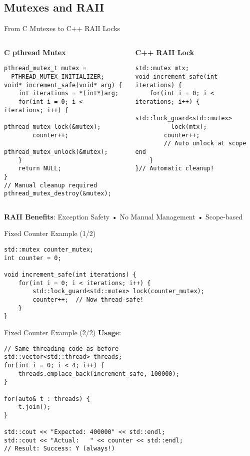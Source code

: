 \subsection{Mutexes and RAII}
\begin{frame}[fragile]{ From C Mutexes to C++ RAII Locks}
	\begin{columns}
		\begin{column}{0.5\textwidth}
			\textbf{C pthread Mutex}
			\begin{verbatim}
pthread_mutex_t mutex =
  PTHREAD_MUTEX_INITIALIZER;
void* increment_safe(void* arg) {
    int iterations = *(int*)arg;
    for(int i = 0; i < iterations; i++) {
        pthread_mutex_lock(&mutex);
        counter++;
        pthread_mutex_unlock(&mutex);
    }
    return NULL;
}
// Manual cleanup required
pthread_mutex_destroy(&mutex);
			\end{verbatim}
		\end{column}
		\begin{column}{0.5\textwidth}
			\textbf{C++ RAII Lock}
			\begin{verbatim}
std::mutex mtx;
void increment_safe(int iterations) {
    for(int i = 0; i < iterations; i++) {
        std::lock_guard<std::mutex>
          lock(mtx);
        counter++;
        // Auto unlock at scope end
    }
}// Automatic cleanup!
			\end{verbatim}
		\end{column}
	\end{columns}

	\vspace{0.5em}
	\textbf{RAII Benefits}: Exception Safety • No Manual Management • Scope-based
\end{frame}

\begin{frame}[fragile]{ Fixed Counter Example (1/2)}
	\begin{verbatim}
std::mutex counter_mutex;
int counter = 0;

void increment_safe(int iterations) {
    for(int i = 0; i < iterations; i++) {
        std::lock_guard<std::mutex> lock(counter_mutex);
        counter++;  // Now thread-safe!
    }
}
	\end{verbatim}
\end{frame}

\begin{frame}[fragile]{ Fixed Counter Example (2/2)}
	\textbf{Usage}:

	\begin{verbatim}
// Same threading code as before
std::vector<std::thread> threads;
for(int i = 0; i < 4; i++) {
    threads.emplace_back(increment_safe, 100000);
}

for(auto& t : threads) {
    t.join();
}

std::cout << "Expected: 400000" << std::endl;
std::cout << "Actual:   " << counter << std::endl;
// Result: Success: Y (always!)
	\end{verbatim}
\end{frame}

